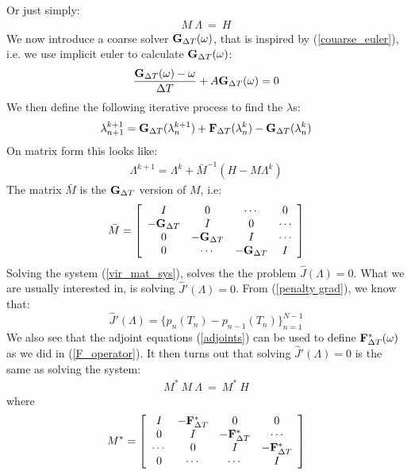 \documentclass[11pt,a4paper]{article}
\begin{document}
Or just simply:
\begin{align}
M \ \Lambda \ = \ H \label{vir_mat_sys}
\end{align}
We now introduce a coarse solver $\bold{G}_{\Delta T}(\omega)$, that is inspired by (\ref{couarse_euler}), i.e. we use implicit euler to calculate $\bold{G}_{\Delta T}(\omega)$:
\begin{align}
\frac{\bold{G}_{\Delta T}(\omega) -\omega }{\Delta T } + A \bold{G}_{\Delta T}(\omega) = 0
\end{align}  
We then define the following iterative process to find the $\lambda$s:
\begin{align}
\lambda_{n+1}^{k+1} = \bold{G}_{\Delta T}(\lambda_{n}^{k+1}) + \bold{F}_{\Delta T}(\lambda_{n}^{k})-\bold{G}_{\Delta T}(\lambda_{n}^{k})
\end{align} 
On matrix form this looks like:
\begin{align}
\Lambda^{k+1} = \Lambda^k + \bar{M}^{-1}(H-M\Lambda^k) \label{matrix_iter1}
\end{align}
The matrix $\bar{M}$ is the $\bold{G}_{\Delta T}$ version of $M$, i.e:
\begin{align}
\bar{M} = \left[ \begin{array}{cccc}
   I & 0 & \cdots & 0 \\  
   -\bold{G}_{\Delta T} & I & 0 & \cdots \\ 
   0 &-\bold{G}_{\Delta T} & I  & \cdots \\
   0 &\cdots &-\bold{G}_{\Delta T} & I   \\
   \end{array}  \right]
\end{align}
Solving the system (\ref{vir_mat_sys}), solves the the problem $\hat{J}(\Lambda)=0$. What we are usually interested in, is solving $\hat{J}'(\Lambda)=0$. From (\ref{penalty grad}), we know that: $$\hat{J}'(\Lambda) = \{p_n(T_n)-p_{n-1}(T_n)\}_{n=1}^{N-1}$$ We also see that the adjoint equations (\ref{adjoints}) can be used to define $\bold{F}_{\Delta T}^*(\omega)$ as we did in (\ref{F_operator}). It then turns out that solving $\hat{J}'(\Lambda)=0$ is the same as solving the system:
\begin{align}
M^* \ M \ \Lambda \ = \ M^* \ H \label{vir_grad_sys}
\end{align}
where 
\begin{align}
M^*= \left[ \begin{array}{cccc}
   I & -\bold{F}_{\Delta T}^* & 0 & 0 \\  
   0 & I & -\bold{F}_{\Delta T}^* & \cdots \\ 
   \cdots &0 & I  & -\bold{F}_{\Delta T}^* \\
   0 &\cdots &\cdots & I   \\
   \end{array}  \right]
\end{align}
\end{document}
